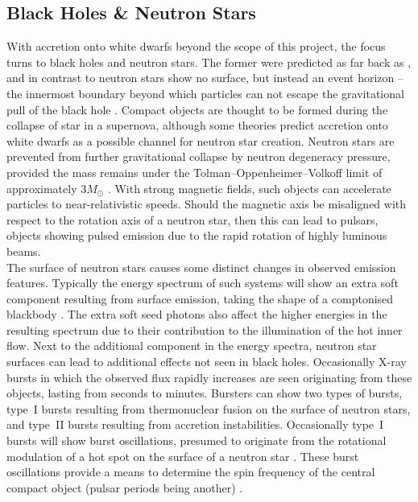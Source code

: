 \subsection{Black Holes \& Neutron Stars}
\label{sec:intro_bh_ns}
With accretion onto white dwarfs beyond the scope of this project, the focus turns to black holes and neutron stars. The former were predicted as far back as  \citeyear{schwarzschild1916gravitationsfeld}, and in contrast to neutron stars show no surface, but instead an event horizon -- the innermost boundary beyond which particles can not escape the gravitational pull of the black hole \citep{schwarzschild1916gravitationsfeld}. Compact objects are thought to be formed during the collapse of star in a supernova, although some theories predict accretion onto white dwarfs as a possible channel for neutron star creation. Neutron stars are prevented from further gravitational collapse by neutron degeneracy pressure, provided the mass remains under the Tolman–Oppenheimer–Volkoff limit of approximately $3M_\odot$ \citep{oppenheimer1939massive, rhoades1974maximum}. With strong magnetic fields, such objects can accelerate particles to near-relativistic speeds. Should the magnetic axis be misaligned with respect to the rotation axis of a neutron star, then this can lead to pulsars, objects showing pulsed emission due to the rapid rotation of highly luminous beams.\\

The surface of neutron stars causes some distinct changes in observed emission features. Typically the energy spectrum of such systems will show an extra soft component resulting from surface emission, taking the shape of a comptonised blackbody \citep{done2007modelling}. The extra soft seed photons also affect the higher energies in the resulting spectrum due to their contribution to the illumination of the hot inner flow. Next to the additional component in the energy spectra, neutron star surfaces can lead to additional effects not seen in black holes. Occasionally X-ray bursts in which the observed flux rapidly increases are seen originating from these objects, lasting from seconds to minutes. Bursters can show two types of bursts, type~I bursts resulting from thermonuclear fusion on the surface of neutron stars, and type~II bursts resulting from accretion instabilities. Occasionally  type~I bursts will show burst oscillations, presumed to originate from the rotational modulation of a hot spot on the surface of a neutron star \citep{watts2012thermonuclear}. These burst oscillations provide a means to determine the spin frequency of the central compact object (pulsar periods being another) \citep{chakrabarty2003nuclear}.

